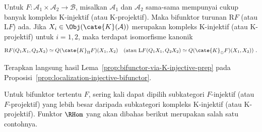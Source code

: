 \begin{proposisi}\label{prop:bifunctor-via-K-injective}
	Untuk $F:\mathcal{A}_1\times\mathcal{A}_2\to\mathcal{B}$, misalkan
	$\mathcal{A}_1$ dan $\mathcal{A}_2$ sama-sama mempunyai cukup banyak
	kompleks K-injektif (atau K-projektif). Maka bifunktor turunan
	$\mathrm{R}F$ (atau $\mathrm{L}F$) ada. Jika
	$X_i\in\Obj(\cate{K}(\mathcal{A}))$ merupakan kompleks K-injektif (atau
	K-projektif) untuk $i=1,2$, maka terdapat isomorfisme kanonik
	\[ \mathrm{R}F(Q_1 X_1, Q_2 X_2) \simeq Q (\cate{K}_{\Pi} F)(X_1, X_2) \quad \text{(atau $\mathrm{L}F(Q_1 X_1, Q_2 X_2) \simeq Q (\cate{K}_{\oplus} F)(X_1, X_2)$) }. \]
\end{proposisi}
\begin{bukti}
	Terapkan langsung hasil Lema~\ref{prop:bifunctor-via-K-injective-prep} pada
	Proposisi~\ref{prop:localization-injective-bifunctor}.
\end{bukti}

Untuk bifunktor tertentu $F$, sering kali dapat dipilih subkategori
$F$-injektif (atau $F$-projektif) yang lebih besar daripada subkategori
kompleks K-injektif (atau K-projektif). Funktor $\RHom$ yang akan dibahas
berikut merupakan salah satu contohnya.

